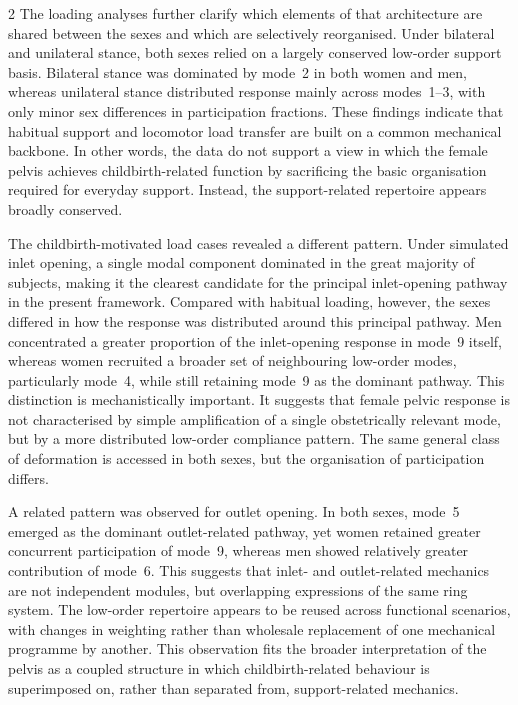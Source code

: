 \documentclass[openacc]{rsproca_new}
\begin{document}
\begin{multicols}{2}
The loading analyses further clarify which elements of that architecture are shared between the sexes and which are selectively reorganised. Under bilateral and unilateral stance, both sexes relied on a largely conserved low-order support basis. Bilateral stance was dominated by mode~2 in both women and men, whereas unilateral stance distributed response mainly across modes~1--3, with only minor sex differences in participation fractions. These findings indicate that habitual support and locomotor load transfer are built on a common mechanical backbone. In other words, the data do not support a view in which the female pelvis achieves childbirth-related function by sacrificing the basic organisation required for everyday support. Instead, the support-related repertoire appears broadly conserved.

The childbirth-motivated load cases revealed a different pattern. Under simulated inlet opening, a single modal component dominated in the great majority of subjects, making it the clearest candidate for the principal inlet-opening pathway in the present framework. Compared with habitual loading, however, the sexes differed in how the response was distributed around this principal pathway. Men concentrated a greater proportion of the inlet-opening response in mode~9 itself, whereas women recruited a broader set of neighbouring low-order modes, particularly mode~4, while still retaining mode~9 as the dominant pathway. This distinction is mechanistically important. It suggests that female pelvic response is not characterised by simple amplification of a single obstetrically relevant mode, but by a more distributed low-order compliance pattern. The same general class of deformation is accessed in both sexes, but the organisation of participation differs.

A related pattern was observed for outlet opening. In both sexes, mode~5 emerged as the dominant outlet-related pathway, yet women retained greater concurrent participation of mode~9, whereas men showed relatively greater contribution of mode~6. This suggests that inlet- and outlet-related mechanics are not independent modules, but overlapping expressions of the same ring system. The low-order repertoire appears to be reused across functional scenarios, with changes in weighting rather than wholesale replacement of one mechanical programme by another. This observation fits the broader interpretation of the pelvis as a coupled structure in which childbirth-related behaviour is superimposed on, rather than separated from, support-related mechanics.


\end{multicols}
\end{document}
